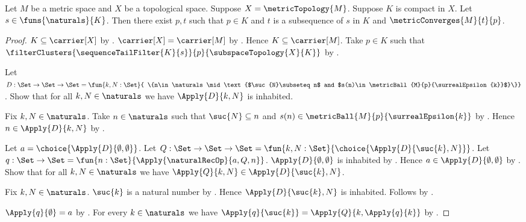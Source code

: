 \begin{theorem}\label{compact_metric_subspace_is_sequentially_compact}
    Let $M$ be a metric space and $X$ be a topological space.
    Suppose $X=\metricTopology{M}$.
    Suppose $K$ is compact in $X$.
    Let $s\in\funs{\naturals}{K}$.
    Then there exist $p,t$ such that $p\in K$ and
        $t$ is a subsequence of $s$ in $K$ and
        $\metricConverges{M}{t}{p}$.
\end{theorem}
\begin{proof}
    $K\subseteq\carrier[X]$ by .
    $\carrier[X]=\carrier[M]$ by
        .
    Hence $K\subseteq\carrier[M]$.
    Take $p\in K$ such that
        $\filterClusters{\sequenceTailFilter{K}{s}}{p}
            {\subspaceTopology{X}{K}}$ by
        .

    Let $D:\Set\to\Set\to\Set=
        \fun{k,N:\Set}{
            \{n\in\naturals\mid
                \text{$\suc{N}\subseteq n$ and
                $s(n)\in\metricBall{M}{p}{\surrealEpsilon{k}}$}\}}$.
    Show that for all $k,N\in\naturals$ we have
        $\Apply{D}{k,N}$ is inhabited.
    \begin{subproof}
        Fix $k,N\in\naturals$.
        Take $n\in\naturals$ such that $\suc{N}\subseteq n$ and
            $s(n)\in\metricBall{M}{p}{\surrealEpsilon{k}}$ by
            .
        Hence $n\in\Apply{D}{k,N}$ by \auto.
    \end{subproof}

    Let $a=\choice{\Apply{D}{\emptyset,\emptyset}}$.
    Let $Q:\Set\to\Set\to\Set=
        \fun{k,N:\Set}{\choice{\Apply{D}{\suc{k},N}}}$.
    Let $q:\Set\to\Set=
        \fun{n:\Set}{\Apply{\naturalRecOp}{a,Q,n}}$.
    $\Apply{D}{\emptyset,\emptyset}$ is inhabited by
        .
    Hence $a\in\Apply{D}{\emptyset,\emptyset}$ by
        .
    Show that for all $k,N\in\naturals$ we have
        $\Apply{Q}{k,N}\in\Apply{D}{\suc{k},N}$.
    \begin{subproof}
        Fix $k,N\in\naturals$.
        $\suc{k}$ is a natural number by .
        Hence $\Apply{D}{\suc{k},N}$ is inhabited.
        Follows by .
    \end{subproof}
    $\Apply{q}{\emptyset}=a$ by
        .
    For every $k\in\naturals$ we have
        $\Apply{q}{\suc{k}}=\Apply{Q}{k,\Apply{q}{k}}$ by
        .


\end{proof}
